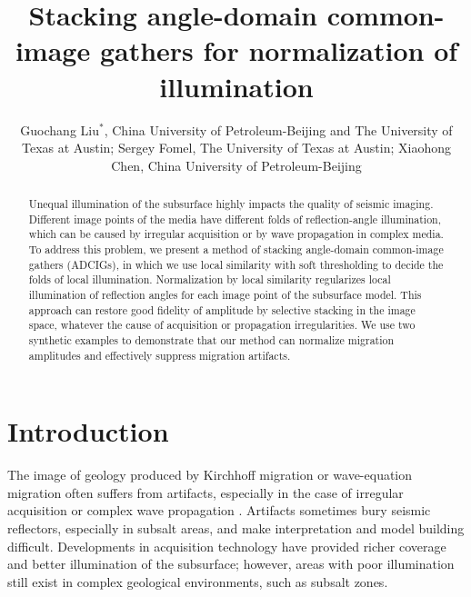 
\title{Stacking angle-domain common-image gathers for normalization of illumination}
\author{Guochang Liu$^{*}$, China University of Petroleum-Beijing and 
The University of Texas at Austin; Sergey Fomel,
The University of Texas at Austin; Xiaohong Chen, 
China University of Petroleum-Beijing
}


\maketitle
\sloppy

\begin{abstract}
Unequal illumination of the subsurface highly impacts the quality of seismic imaging. 
Different image points of the media have different folds of reflection-angle illumination, 
which can be caused by irregular acquisition or by wave propagation in complex media. 
To address this problem, we present a method of stacking angle-domain common-image gathers (ADCIGs), 
in which we use local similarity with soft thresholding to decide the folds of local illumination. 
Normalization by local similarity regularizes local illumination of reflection angles 
for each image point of the subsurface model. This approach can restore good fidelity of amplitude
by selective stacking in the image space, whatever the cause of acquisition or propagation irregularities.
We use two synthetic examples to demonstrate that our method can normalize migration amplitudes and 
effectively suppress migration artifacts.

\end{abstract}

\section{Introduction}

The image of geology produced by Kirchhoff migration or wave-equation migration often suffers from artifacts, 
especially in the case of irregular acquisition or complex wave propagation \cite[]{Qin,Tang}. 
Artifacts sometimes bury seismic reflectors, especially in subsalt areas, and make interpretation and model 
building difficult. Developments in acquisition technology \cite[]{Howard,Michell} 
have provided richer coverage and better illumination of the subsurface; however, areas with poor illumination 
still exist in complex geological environments, such as subsalt zones. 

